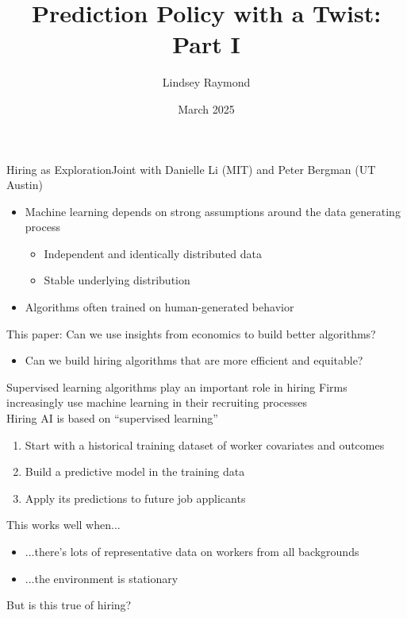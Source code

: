 \documentclass[aspectratio=169,t,11pt,table]{beamer}
\title{Prediction Policy with a Twist: Part I}
\date{March 2025}
\author{Lindsey Raymond}
\institute{ {\small Microsoft Research \& Harvard University}}
\begin{document}
\begin{frame}
\maketitle
\end{frame}


\begin{frame}{Hiring as Exploration}{Joint with Danielle Li (MIT) and Peter Bergman (UT Austin)} \small 

\begin{itemize}
\item Machine learning depends on strong assumptions around the data generating process
\begin{itemize}
\item Independent and identically distributed data
\item Stable underlying distribution
\end{itemize}
\medskip \pause 
\item Algorithms often trained on human-generated behavior
\end{itemize}
\alert{This paper:} Can we use insights from economics to build better algorithms?
\begin{itemize}
    \item Can we build hiring algorithms that are more efficient and equitable?
\end{itemize}
\end{frame}




\begin{frame}{Supervised learning algorithms play an important role in hiring} \small 
\alert{Firms increasingly use machine learning in their recruiting processes} \\
\vspace{2mm}
\alert{Hiring AI is based on ``supervised learning''}
\begin{enumerate}
\item Start with a historical training dataset of worker covariates and outcomes
\item Build a predictive model in the training data
\item Apply its predictions to future job applicants %
\end{enumerate}
\bigskip
\pause 
\alert{This works well when...}
\begin{itemize}
\item ...there's lots of representative data on workers from all backgrounds
\item ...the environment is stationary
\end{itemize}
\bigskip %
\alert{But is this true of hiring?}
\end{frame}
\end{document}
